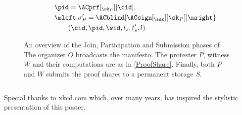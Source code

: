 \begin{columns}[t]
\begin{column}{0.32\linewidth}
\begin{figure}
\begin{minipage}{\linewidth}
\begin{align*}
          & \qquad \pid = \ACprf[_{\sk_P}][\cid], \\
          & \qquad \mleft. \sigma_P' = \ACblind[\ACsign[_{\ssk}][\sk_P]] \mright\} 
          \\
          & \qquad\qquad (\cid, \pid, \wid, t_s, t_s', l)
        \end{align*}
      \end{minipage}
      \caption{\label{Protocol}%
        An overview of the Join, Participation and Submission phases of \CROCUS.\@
        The organizer \(O\) broadcasts the manifesto.
        The protester \(P\), witness \(W\) and their computations are as in 
        \cref{ProofShare}.
        Finally, both \(P\) and \(W\) submits the proof shares to a permanent storage \(S\).
      }%
    \end{figure}

  \end{column}

\end{columns}

\vfill
\flushright{}
Special thanks to xkcd.com which, over many years, has inspired the stylistic 
presentation of this poster.
